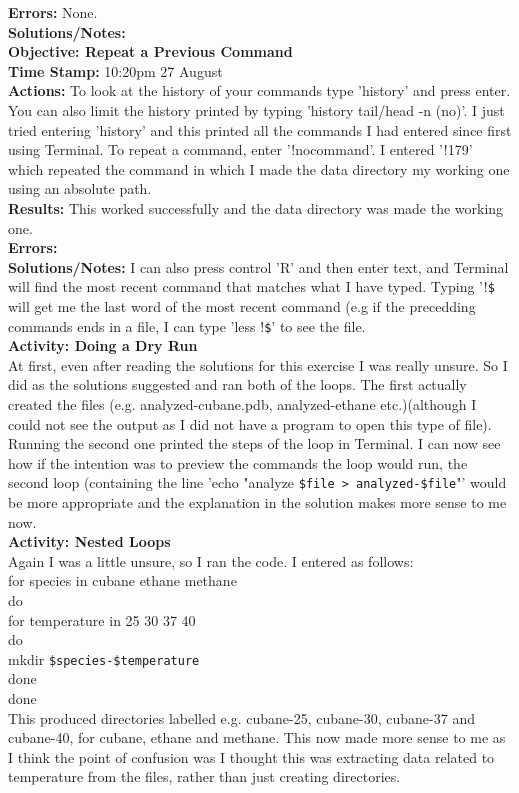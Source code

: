 \documentclass{article}
\begin{document}
\begin{FlushLeft}
\textbf{Errors:} None. \\
\textbf{Solutions/Notes:}\\
\vspace{5mm}
\textbf{Objective: Repeat a Previous Command}\\ 
\textbf{Time Stamp:} 10:20pm  27 August\\
\textbf{Actions:} To look at the history of your commands type 'history' and press enter. You can also limit the history printed by typing 'history \textbar{} tail/head -n (no)'. I just tried entering 'history' and this printed all the commands I had entered since first using Terminal. To repeat a command, enter '!nocommand'. I entered '!179' which repeated the command in which I made the data directory my working one using an absolute path. \\
\textbf{Results:} This worked successfully and the data directory was made the working one. \\
\textbf{Errors:} \\
\textbf{Solutions/Notes:} I can also press control 'R' and then enter text, and Terminal will find the most recent command that matches what I have typed. Typing '!\verb|$| will get me the last word of the most recent command (e.g if the precedding commands ends in a file, I can type 'less !\verb|$|' to see the file.\\
\vspace{5mm}
\textbf{Activity: Doing a Dry Run}\\
At first, even after reading the solutions for this exercise I was really unsure. So I did as the solutions suggested and ran both of the loops. The first actually created the files (e.g. analyzed-cubane.pdb, analyzed-ethane etc.)(although I could not see the output as I did not have a program to open this type of file). Running the second one printed the steps of the loop in Terminal. I can now see how if the intention was to preview the commands the loop would run, the second loop (containing the line 'echo "analyze \verb|$file > analyzed-$file|"' would be more appropriate and the explanation in the solution makes more sense to me now.\\
\vspace{5mm}
\textbf{Activity: Nested Loops}\\
Again I was a little unsure, so I ran the code. I entered  as follows:\\
for species in cubane ethane methane\\
do\\
for temperature in 25 30 37 40\\
do\\
mkdir \verb|$species-$temperature|\\
done\\
done\\
This produced directories labelled e.g. cubane-25, cubane-30, cubane-37 and cubane-40, for cubane, ethane and methane. This now made more sense to me as I think the point of confusion was I thought this was extracting data related to temperature from the files, rather than just creating directories.\\
\vspace{5mm}


\end{FlushLeft}
\end{document}
